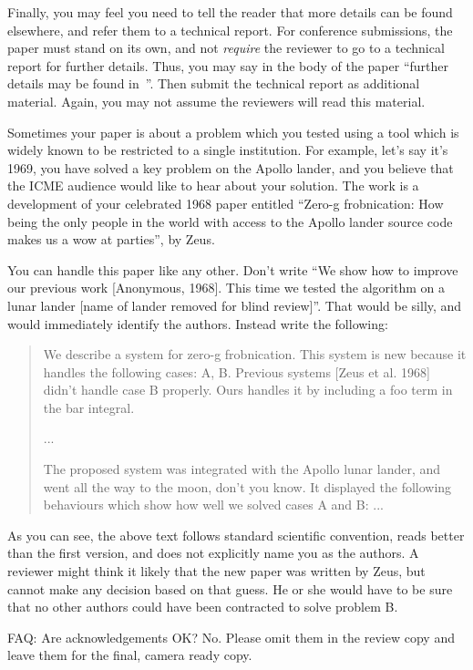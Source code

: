 \documentclass{article}
\begin{document}
Finally, you may feel you need to tell the reader that more details can be found elsewhere, and refer them to a technical report. For conference
submissions, the paper must stand on its own, and not {\em require} the reviewer to go to a technical report for further details. Thus, you may say in
the body of the paper ``further details may be found in~\cite{Authors12b}''.  Then submit the technical report as additional material. Again, you may not assume the reviewers will read this material.

Sometimes your paper is about a problem which you tested using a tool which is widely known to be restricted to a single institution.  For example, let's say it's 1969, you have solved a key problem on the Apollo lander, and you believe that the ICME audience would like to hear about your solution.  The work is a development of your celebrated 1968 paper entitled ``Zero-g frobnication: How being the only people in the world with access to the Apollo lander source code makes us a wow at parties'', by Zeus.

You can handle this paper like any other.  Don't write ``We show how to improve our previous work [Anonymous, 1968].  This time we tested the algorithm on a lunar lander [name of lander removed for blind review]''. That would be silly, and would immediately identify the authors. Instead write the following:
\begin{quotation}
\noindent
   We describe a system for zero-g frobnication.  This
   system is new because it handles the following cases:
   A, B.  Previous systems [Zeus et al. 1968] didn't
   handle case B properly.  Ours handles it by including
   a foo term in the bar integral.

   ...

   The proposed system was integrated with the Apollo
   lunar lander, and went all the way to the moon, don't
   you know.  It displayed the following behaviours
   which show how well we solved cases A and B: ...
\end{quotation}

As you can see, the above text follows standard scientific convention, reads better than the first version, and does not explicitly name you as the authors. A reviewer might think it likely that the new paper was written by Zeus, but cannot make any decision based on that guess. He or she would have to be sure that no other authors could have been contracted to solve problem B.

FAQ: Are acknowledgements OK?  No. Please omit them in the review copy and leave them for the final, camera ready copy.
\end{document}
